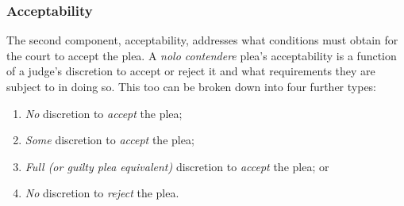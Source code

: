 \subsubsection{Acceptability}

The second component, acceptability, addresses what conditions must obtain for the court to accept the plea. A \textit{nolo contendere} plea's acceptability is a function of a judge’s discretion to accept or reject it and what requirements they are subject to in doing so. This too can be broken down into four further types:

\begin{enumerate}
\item \textit{No} discretion to \textit{accept} the plea;
\item \textit{Some} discretion to \textit{accept} the plea;
\item \textit{Full (or guilty plea equivalent)} discretion to \textit{accept} the plea; or
\item \textit{No} discretion to \textit{reject} the plea.%
\end{enumerate}

